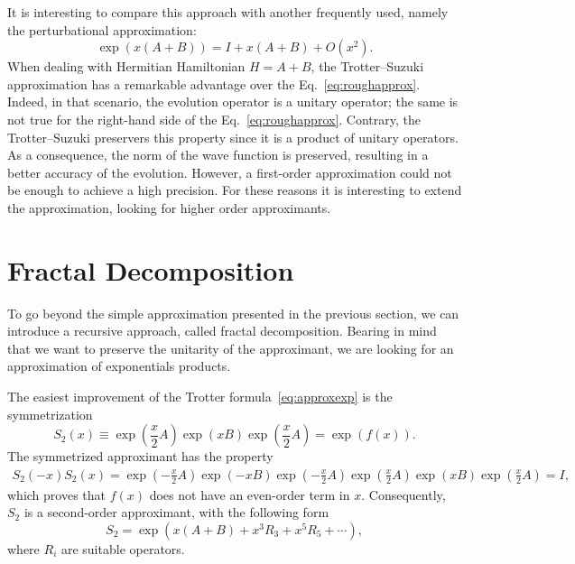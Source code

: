 It is interesting to compare this approach with another frequently used, namely the perturbational approximation:
\begin{equation} \label{eq:roughapprox}
\exp\left({x(A+B)}\right) = I + x(A+B) + O(x^2).
\end{equation}
When dealing with Hermitian Hamiltonian $H=A+B$, the Trotter--Suzuki approximation has a remarkable advantage over the Eq.~\eqref{eq:roughapprox}. Indeed, in that scenario, the evolution operator is a unitary operator; the same is not true for the right-hand side of the Eq.~\eqref{eq:roughapprox}. Contrary, the Trotter--Suzuki preservers this property since it is a product of unitary operators. As a consequence, the norm of the wave function is preserved, resulting in a better accuracy of the evolution. However, a first-order approximation could not be enough  to achieve a high precision. For these reasons it is interesting to extend the approximation, looking for higher order approximants.

\section{Fractal Decomposition}
To go beyond the simple approximation presented in the previous section, we can introduce a recursive approach, called fractal decomposition. Bearing in mind that we want to preserve the unitarity of the approximant, we are looking for an approximation of exponentials products.

The easiest improvement of the Trotter formula~\eqref{eq:approxexp} is the symmetrization
\begin{equation} 
S_2(x) \equiv \exp\left({\frac{x}{2}A}\right) \exp\left({xB}\right) \exp\left({\frac{x}{2}A}\right) = \exp\left({f(x)}\right).
\end{equation}
The symmetrized approximant has the property
\begin{align}
S_2(-x) S_2(x) = \exp\left({-\frac{x}{2}A}\right) \exp\left({-xB}\right) \exp\left({-\frac{x}{2}A}\right) \exp\left({\frac{x}{2}A}\right) \exp\left({xB}\right) \exp\left({\frac{x}{2}A}\right) = I, \nonumber
\end{align}
which proves that $f(x)$ does not have an even-order term in $x$. Consequently, $S_2$ is a second-order approximant, with the following form
\begin{equation} \label{eq:S2-form}
S_2 = \exp\left({x(A+B) + x^3R_3 + x^5R_5 + \cdots}\right),
\end{equation}
where $R_i$ are suitable operators.


